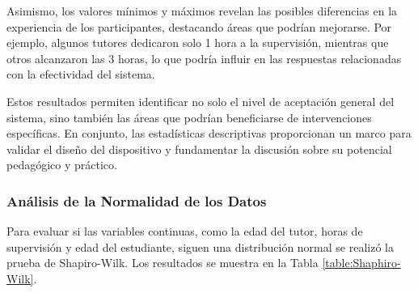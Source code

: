 \documentclass[a4paper,fleqn]{cas-sc}
\begin{document}
				Asimismo, los valores mínimos y máximos revelan las posibles diferencias en la experiencia de los participantes, destacando áreas que podrían mejorarse. Por ejemplo, algunos tutores dedicaron solo 1 hora a la supervisión, mientras que otros alcanzaron las 3 horas, lo que podría influir en las respuestas relacionadas con la efectividad del sistema.
				
				Estos resultados permiten identificar no solo el nivel de aceptación general del sistema, sino también las áreas que podrían beneficiarse de intervenciones específicas. En conjunto, las estadísticas descriptivas proporcionan un marco para validar el diseño del dispositivo y fundamentar la discusión sobre su potencial pedagógico y práctico.
				
				\subsubsection{Análisis de la Normalidad de los Datos}
					Para evaluar si las variables continuas, como la edad del tutor, horas de supervisión y edad del estudiante, siguen una distribución normal se realizó la prueba de Shapiro-Wilk. Los resultados se muestra en la Tabla \ref{table:Shaphiro-Wilk}.
					
\end{document}

